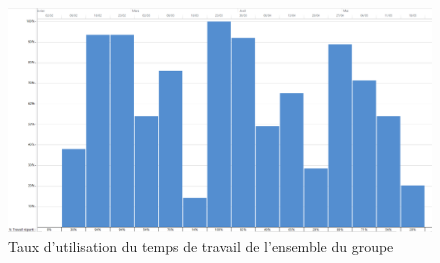 		\begin{landscape}
		 	\begin{figure}
	            \centering
	            \includegraphics[height=0.70\textwidth]{figure/TauxUtilisation.png}
	            \caption{Taux d'utilisation du temps de travail de l'ensemble du groupe }
	            \label{fig:taux_utilisation}
	        \end{figure}
	    \end{landscape}